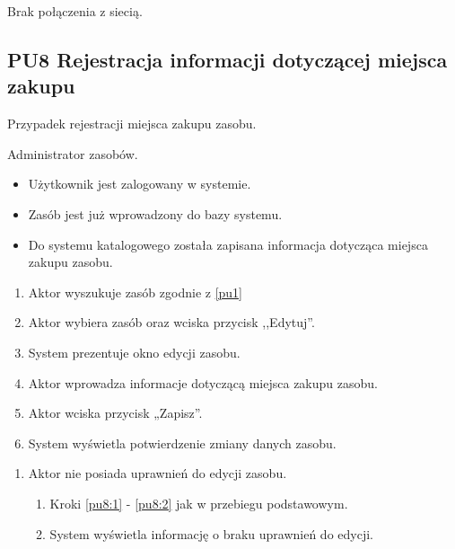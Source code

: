Brak połączenia z siecią.

\subsection{PU8 Rejestracja informacji dotyczącej miejsca zakupu} \label{pu8}
Przypadek rejestracji miejsca zakupu zasobu.

Administrator zasobów.

\begin{itemize}
\item Użytkownik jest zalogowany w systemie.
\item Zasób jest już wprowadzony do bazy systemu.
\end{itemize}

\begin{itemize}
\item Do systemu katalogowego została zapisana informacja dotycząca miejsca zakupu zasobu.
\end{itemize}

\begin{enumerate}
	\item \label{pu8:1} Aktor wyszukuje zasób zgodnie z \ref{pu1}
	\item \label{pu8:2} Aktor wybiera zasób oraz wciska przycisk ,,Edytuj''.
	\item System prezentuje okno edycji zasobu.
	\item Aktor wprowadza informacje dotyczącą miejsca zakupu zasobu.
	\item Aktor wciska przycisk „Zapisz”.
	\item System wyświetla potwierdzenie zmiany danych zasobu.
\end{enumerate}

\begin{enumerate}
	\item Aktor nie posiada uprawnień do edycji zasobu.
	\begin{enumerate}[label*=\arabic*.]
		\item Kroki \ref{pu8:1} - \ref{pu8:2} jak w przebiegu podstawowym.
		\item System wyświetla informację o braku uprawnień do edycji.
	\end{enumerate}
\end{enumerate}

